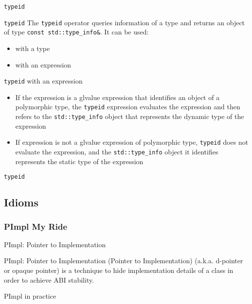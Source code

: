 \begin{frame}{\texttt{typeid}}{}
  \begin{block}{\texttt{typeid}}
    The \lstinline!typeid! operator queries information of a type and returns an object of type \lstinline!const std::type_info&!. It can be used:
    \begin{itemize}
    \item
      with a type
    \item
      with an expression
    \end{itemize}
  \end{block}

  \begin{block}{\texttt{typeid} with an expression}
    \begin{itemize}
    \item
      If the expression is a glvalue expression that identifies an object of a polymorphic type, the \lstinline!typeid! expression evaluates the expression and then refers to the \lstinline!std::type_info! object that represents the dynamic type of the expression
    \item
      If expression is not a glvalue expression of polymorphic type, \lstinline!typeid! does not evaluate the expression, and the \lstinline!std::type_info! object it identifies represents the static type of the expression
    \end{itemize}
  \end{block}
\end{frame}

\begin{frame}{\texttt{typeid}}{}
  \begin{example}
  \end{example}
\end{frame}

\subsection{Idioms}

\subsubsection{PImpl My Ride}

\begin{frame}{PImpl: Pointer to Implementation}{}
  \begin{block}{PImpl: Pointer to Implementation}
     (Pointer to Implementation) (a.k.a. d-pointer or opaque pointer) is a technique to hide implementation details of a class in order to achieve ABI stability.
  \end{block}

  \begin{block}{PImpl in practice}
  \end{block}
\end{frame}

